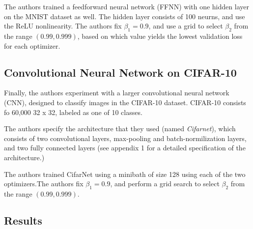 \documentclass[letterpaper, 10 pt, conference]{ieeeconf}  %
\begin{document}
The authors trained a feedforward neural network (FFNN) with one hidden layer on the MNIST dataset as well. The hidden layer consists of 100 neurns, and use the ReLU nonlinearity. The authors fix $\beta_{1} = 0.9$, and use a grid to select $\beta_{2}$ from the range $(0.99, 0.999)$, based on which value yields the lowest validation loss for each optimizer.

\subsection{Convolutional Neural Network on CIFAR-10}

Finally, the authors experiment with a larger convolutional neural network (CNN), designed to classify images in the CIFAR-10 dataset. CIFAR-10 consists fo 60,000  32 x 32, labeled as one of 10 classes.

The authors specify the architecture that they used (named \emph{Cifarnet}), which consists of two convolutional layers, max-pooling and batch-normilization layers, and two fully connected layers (see appendix 1 for a detailed specification of the architecture.)

The authors trained CifarNet using a minibath of size 128 using each of the two optimizers.The authors fix $\beta_{1} = 0.9$, and perform a grid search to select $\beta_{2}$ from the range $(0.99, 0.999)$.

\subsection{Results}
\end{document}

